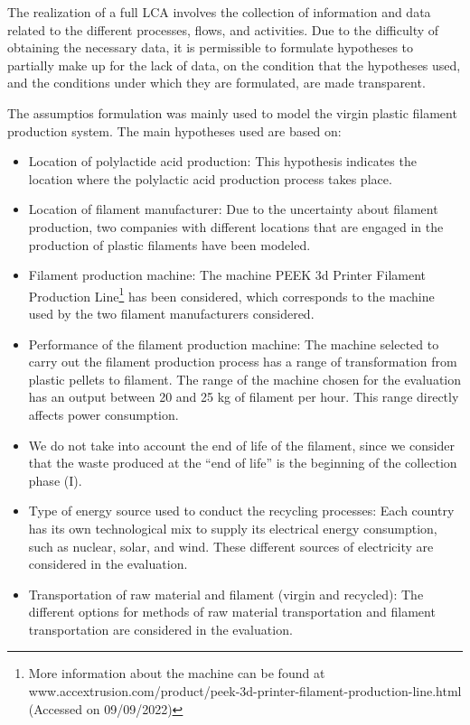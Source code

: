 \documentclass[12pt]{elsarticle} %
\begin{document}
The realization of a full LCA involves the collection of information and data related to the different processes, flows, and activities. Due to the difficulty of obtaining the necessary data, it is permissible to formulate hypotheses to partially make up for the lack of data, on the condition that the hypotheses used, and the conditions under which they are formulated, are made transparent.

The assumptios formulation was mainly used to model the virgin plastic filament production system. The main hypotheses used are based on:

\begin{itemize}
\item
  Location of polylactide acid production: This hypothesis indicates the location where the polylactic acid production process takes place.
\item
  Location of filament manufacturer: Due to the uncertainty about filament production, two companies with different locations that are engaged in the production of plastic filaments have been modeled.
\item
  Filament production machine: The machine PEEK 3d Printer Filament Production Line\footnote{More information about the machine can be found at www.accextrusion.com/product/peek-3d-printer-filament-production-line.html (Accessed on 09/09/2022)} has been considered, which corresponds to the machine used by the two filament manufacturers considered.
\item
  Performance of the filament production machine: The machine selected to carry out the filament production process has a range of transformation from plastic pellets to filament. The range of the machine chosen for the evaluation has an output between 20 and 25 kg of filament per hour. This range directly affects power consumption.
\item
  We do not take into account the end of life of the filament, since we consider that the waste produced at the ``end of life'' is the beginning of the collection phase (I).
\item
  Type of energy source used to conduct the recycling processes: Each country has its own technological mix to supply its electrical energy consumption, such as nuclear, solar, and wind. These different sources of electricity are considered in the evaluation.
\item
  Transportation of raw material and filament (virgin and recycled): The different options for methods of raw material transportation and filament transportation are considered in the evaluation.
\end{itemize}
\end{document}
